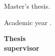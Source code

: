 


\thispagestyle{empty}

\begin{center}
  \large  


  \begingroup
  \huge{\miTitulo} \\
  \bigskip
  
  \endgroup

  \textrm{\miNombre}


\end{center}  

\newpage
\thispagestyle{empty}

\hfill

\vfill

\miNombre\ \ \ \textit{\miTitulo}

Master's thesis.

Academic year \miCurso.\\

\begin{minipage}[t]{0.25\textwidth}
  \flushleft
  \textbf{Thesis\\ supervisor}
\end{minipage}
\begin{minipage}[t]{0.40\textwidth}
  \flushleft
  \miTutor
\end{minipage}
\begin{minipage}[t]{0.35\textwidth}
  \flushright
  \miGrado
  \medskip

  \miUniversidad
\end{minipage}
\begin{flushleft}
\end{flushleft}

\endinput

